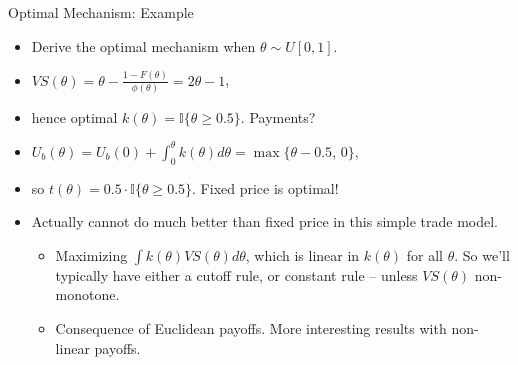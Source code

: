\documentclass[english,10pt
,aspectratio=169
]{beamer}
\begin{document}
\begin{frame}{Optimal Mechanism: Example}
\begin{itemize}[<+->]
	\item Derive the optimal mechanism when $\theta \sim U[0,1]$.
	\item $VS(\theta) = \theta - \frac{1-F(\theta)}{\phi(\theta)} = 2 \theta - 1$,
	\item hence optimal $k(\theta) = \mathbb{I} \{\theta \geq 0.5 \}$. Payments?
	\item $U_b (\theta) = U_b(0) + \int_0^\theta k(\theta) d\theta = \max \{\theta - 0.5,\,0\}$,
	\item so $t(\theta) = 0.5 \cdot \mathbb{I} \{\theta \geq 0.5 \}$. Fixed price is optimal!
	\item Actually cannot do much better than fixed price in this simple trade model.
	\begin{itemize}
		\item Maximizing $\int k(\theta) VS(\theta) d\theta$, which is linear in $k(\theta)$ for all $\theta$. So we'll typically have either a cutoff rule, or constant rule -- unless $VS(\theta)$ non-monotone.
		\item Consequence of Euclidean payoffs. More interesting results with non-linear payoffs.
	\end{itemize}
\end{itemize}
\end{frame}


%
%
%
%
%
\end{document}
